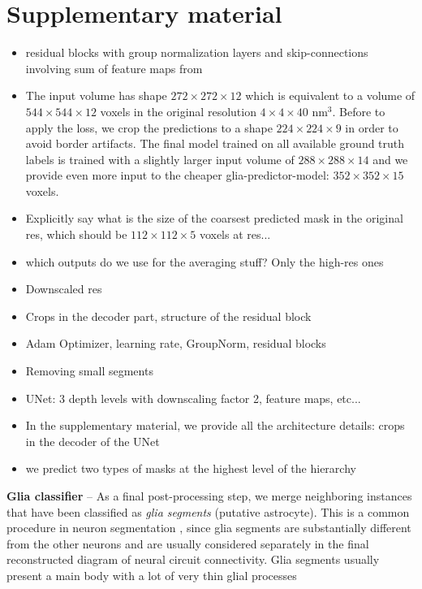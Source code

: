 
\section{Supplementary material}
\begin{itemize}
\item residual blocks with group normalization layers and skip-connections involving sum of feature maps from 
\item The input volume has shape $272 \times 272\times12$ which is equivalent to a volume of $544\times 544\times 12$ voxels in the original resolution $4\times 4\times 40$ nm$^3$. Before to apply the loss, we crop the predictions to a shape $224\times 224\times 9$ in order to avoid border artifacts. 
The final model trained on all available ground truth labels is trained with a slightly larger input volume of $288\times 288\times 14$ and we provide even more input to the cheaper glia-predictor-model: $352\times 352\times 15$ voxels. 
\item Explicitly say what is the size of the coarsest predicted mask in the original res, which should be $112 \times 112 \times 5$ voxels at res...
\item which outputs do we use for the averaging stuff? Only the high-res ones
\item Downscaled res
\item Crops in the decoder part, structure of the residual block
\item Adam Optimizer, learning rate, GroupNorm, residual blocks
\item Removing small segments
\item UNet: 3 depth levels with downscaling factor 2, feature maps, etc...
\item In the supplementary material, we provide all the architecture details: crops in the decoder of the UNet
\item we predict two types of \maskname masks at the highest level of the hierarchy
\end{itemize}

\textbf{Glia classifier} -- As a final post-processing step, we merge neighboring instances that have been classified as \emph{glia segments} (putative astrocyte). This is a common procedure in neuron segmentation \cite{lee2019learning}, since glia segments are substantially different from the other neurons and are usually considered separately in the final reconstructed diagram of neural circuit connectivity. Glia segments usually present a main body with a lot of very thin glial processes
